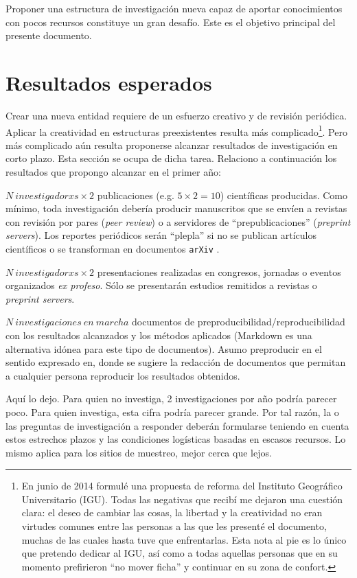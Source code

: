 \documentclass[12pt,letterpaper,spanish]{article}
\begin{document}
Proponer una estructura de investigación nueva capaz de aportar conocimientos con pocos recursos constituye un gran desafío. Este es el objetivo principal del presente documento.

\section{Resultados esperados} \label{cap:resesp}

Crear una nueva entidad requiere de un esfuerzo creativo y de revisión periódica. Aplicar la creatividad en estructuras preexistentes resulta más complicado\footnote{En junio de 2014 formulé una propuesta de reforma del Instituto Geográfico Universitario (IGU)\cite{martinez2014futuroigu}. Todas las negativas que recibí me dejaron una cuestión clara: el deseo de cambiar las cosas, la libertad y la creatividad no eran virtudes comunes entre las personas a las que les presenté el documento, muchas de las cuales hasta tuve que enfrentarlas. Esta nota al pie es lo único que pretendo dedicar al IGU, así como a todas aquellas personas que en su momento prefirieron ``no mover ficha'' y continuar en su zona de confort.}. Pero más complicado aún resulta proponerse alcanzar resultados de investigación en corto plazo. Esta sección se ocupa de dicha tarea. Relaciono a continuación los resultados que propongo alcanzar en el primer año:

\begin{itemize}
\item $N~investigadorxs \times 2$ publicaciones (e.g. $5 \times 2=10$) científicas producidas. Como mínimo, toda investigación debería producir manuscritos que se envíen a revistas con revisión por pares (\textit{peer review}) o a servidores de ``prepublicaciones'' (\textit{preprint servers}). Los reportes periódicos serán ``plepla'' si no se publican artículos científicos o se transforman en documentos \texttt{arXiv} \cite{revisionpares, preprints, prepublicacion, arxiv}.
\item $N~investigadorxs \times 2$ presentaciones realizadas en congresos, jornadas o eventos organizados \textit{ex profeso}. Sólo se presentarán estudios remitidos a revistas o \textit{preprint servers}.
\begin{sloppypar}
\item $N~investigaciones~en~marcha$ documentos de preproducibilidad/reproducibilidad con los resultados alcanzados y los métodos aplicados (Markdown es una alternativa idónea para este tipo de documentos\cite{wiki2018markdown}). Asumo preproducir en el sentido expresado en\cite{stark2018before}, donde se sugiere la redacción de documentos que permitan a cualquier persona reproducir los resultados obtenidos.
\end{sloppypar}
\item Aquí lo dejo. Para quien no investiga, 2 investigaciones por año podría parecer poco. Para quien investiga, esta cifra podría parecer grande. Por tal razón, la o las preguntas de investigación a responder deberán formularse teniendo en cuenta estos estrechos plazos y las condiciones logísticas basadas en escasos recursos. Lo mismo aplica para los sitios de muestreo, mejor cerca que lejos.
\end{itemize}
\end{document}

